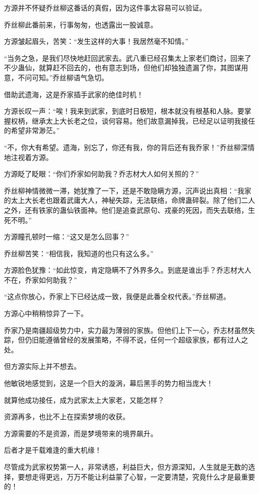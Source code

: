 \begin{this_body}
方源并不怀疑乔丝柳这番话的真假，因为这件事太容易可以验证。

乔丝柳此番前来，行事匆匆，也透露出一股诚意。

方源皱起眉头，苦笑：“发生这样的大事！我居然毫不知情。”

“当务之急，是我们尽快地赶回武家去。武八重已经召集太上家老们商讨，回来了不少蛊仙，就算赶不回去的，也有意志到场，但他们却独独遗漏了你，其图谋用意，不问可知。”乔丝柳语气急切。

借助武遗海，这是乔家插手武家的绝佳时机！

方源长叹一声：“唉！我来到武家，到底时日极短，根本就没有根基和人脉。要掌握权柄，继承太上大长老之位，谈何容易。他们故意漏掉我，已经足以证明我接任的希望非常渺茫。”

“不，你大有希望。遗海，别忘了，你还有我，你的背后还有我乔家！”乔丝柳深情地注视着方源。

方源眨了眨眼：“你们乔家如何助我？乔志材大人如何关照的？”

乔丝柳神情微微一滞，她犹豫了一下，还是不敢隐瞒方源，沉声说出真相：“我家的太上大长老也跟着武庸大人，神秘失踪，无法联络，命牌蛊碎裂。除了他们二人之外，还有铁家的蛊仙铁面神。他们是追查武原句、戎豪的死因，而失去联络，生死不明。”

方源瞳孔顿时一缩：“这又是怎么回事？”

乔丝柳苦笑：“相信我，我知道的也只有这么多。”

方源脸色犹豫：“如此惊变，肯定隐瞒不了外界多久。到底是谁出手？乔志材大人不在，乔家如何助我？”

“这点你放心，乔家上下已经达成一致，我便是此番全权代表。”乔丝柳道。

方源心中稍稍惊异了一下。

乔家乃是南疆超级势力中，实力最为薄弱的家族。但他们上下一心，乔志材虽然失踪，但仍旧能遵循曾经的发展策略，不得不说，任何一个超级家族，都有过人之处。

但方源实际上并不想去。

他敏锐地感觉到，这是一个巨大的漩涡，幕后黑手的势力相当庞大！

就算他成功接任，成为武家太上大家老，又能怎样？

资源再多，也比不上在探索梦境的收获。

方源需要的不是资源，而是梦境带来的境界飙升。

后者才是千载难逢的重大机缘！

尽管成为武家权势第一人，非常诱惑，利益巨大，但方源深知，人生就是无数的选择，要想走得更远，万万不能让利益蒙了心智，一定要清楚，究竟什么才是最重要的！


\end{this_body}
